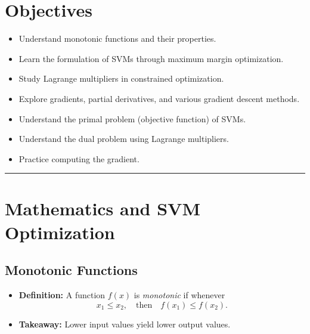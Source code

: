 
\section*{Objectives}
\begin{itemize}
    \item Understand monotonic functions and their properties.
    \item Learn the formulation of SVMs through maximum margin optimization.
    \item Study Lagrange multipliers in constrained optimization.
    \item Explore gradients, partial derivatives, and various gradient descent methods.
    \item Understand the primal problem (objective function) of SVMs.
    \item Understand the dual problem using Lagrange multipliers.
    \item Practice computing the gradient.
\end{itemize}

\rule[0.0051in]{\textwidth}{0.00025in}

\section{Mathematics and SVM Optimization}

\subsection{Monotonic Functions}
\begin{itemize}
    \item \textbf{Definition:} A function \( f(x) \) is \emph{monotonic} if whenever 
    \[
    x_1 \leq x_2, \quad \text{then} \quad f(x_1) \leq f(x_2).
    \]
    \item \textbf{Takeaway:} Lower input values yield lower output values.
\end{itemize}

